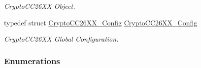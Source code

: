 \begin{DoxyCompactItemize}
\begin{DoxyCompactList}\small\item\em Crypto\+C\+C26\+X\+X Object. \end{DoxyCompactList}\item 
typedef struct \hyperlink{struct_crypto_c_c26_x_x___config}{Crypto\+C\+C26\+X\+X\+\_\+\+Config} \hyperlink{_crypto_c_c26_x_x_8h_a7ff3fbcb90bc60cea7c5a281d5c7add2}{Crypto\+C\+C26\+X\+X\+\_\+\+Config}
\begin{DoxyCompactList}\small\item\em Crypto\+C\+C26\+X\+X Global Configuration. \end{DoxyCompactList}\end{DoxyCompactItemize}
\subsubsection*{Enumerations}
